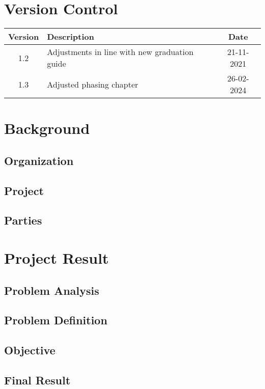 \documentclass{article}
\begin{document}
\newpage

\section*{Version Control}

\begin{tabular}{|c|l|c|}
    \hline
    Version & Description & Date \\
    \hline
    1.2 & Adjustments in line with new graduation guide & 21-11-2021 \\
    1.3 & Adjusted phasing chapter & 26-02-2024 \\
    \hline
\end{tabular}

\newpage

\tableofcontents

\newpage

\section{Background}
\subsection{Organization}
\subsection{Project}
\subsection{Parties}


\newpage

\section{Project Result}
\subsection{Problem Analysis}
\subsection{Problem Definition}
\subsection{Objective}
\subsection{Final Result}
\end{document}

